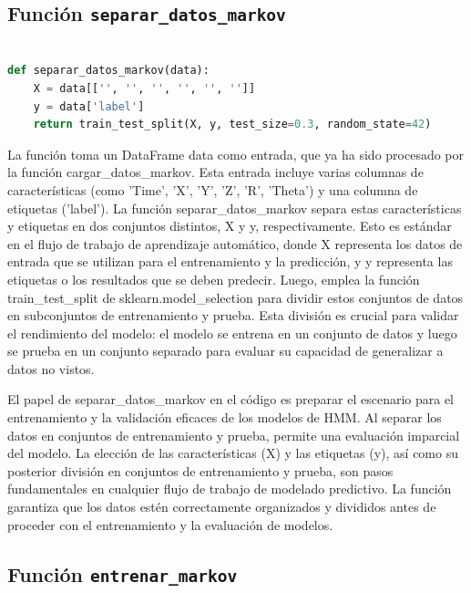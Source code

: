 \documentclass[12pt]{article}
\begin{document}
\subsection*{Función \texttt{separar\_datos\_markov}}
\vspace{1cm}

\begin{lstlisting}[language=Python]

def separar_datos_markov(data):
	X = data[['', '', '', '', '', '']]
	y = data['label']
	return train_test_split(X, y, test_size=0.3, random_state=42)

\end{lstlisting}
\vspace{1cm}

La función toma un DataFrame data como entrada, que ya ha sido procesado por la función cargar\_datos\_markov. Esta entrada incluye varias columnas de características (como 'Time', 'X', 'Y', 'Z', 'R', 'Theta') y una columna de etiquetas ('label'). La función separar\_datos\_markov separa estas características y etiquetas en dos conjuntos distintos, X y y, respectivamente. Esto es estándar en el flujo de trabajo de aprendizaje automático, donde X representa los datos de entrada que se utilizan para el entrenamiento y la predicción, y y representa las etiquetas o los resultados que se deben predecir. Luego, emplea la función train\_test\_split de sklearn.model\_selection para dividir estos conjuntos de datos en subconjuntos de entrenamiento y prueba. Esta división es crucial para validar el rendimiento del modelo: el modelo se entrena en un conjunto de datos y luego se prueba en un conjunto separado para evaluar su capacidad de generalizar a datos no vistos.\vspace{1cm}

El papel de separar\_datos\_markov en el código es preparar el escenario para el entrenamiento y la validación eficaces de los modelos de HMM. Al separar los datos en conjuntos de entrenamiento y prueba, permite una evaluación imparcial del modelo. La elección de las características (X) y las etiquetas (y), así como su posterior división en conjuntos de entrenamiento y prueba, son pasos fundamentales en cualquier flujo de trabajo de modelado predictivo. La función garantiza que los datos estén correctamente organizados y divididos antes de proceder con el entrenamiento y la evaluación de modelos.

\vspace{1cm}

\subsection*{Función \texttt{entrenar\_markov}}
\vspace{1cm}
\end{document}
